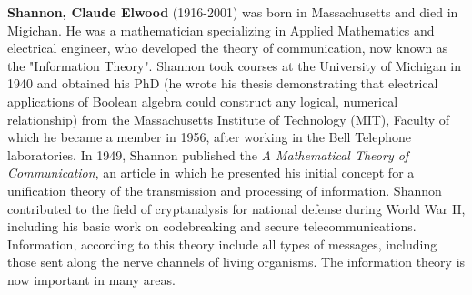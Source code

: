 \textbf{Shannon, Claude Elwood} (1916-2001) was born in Massachusetts and died in Migichan. He was a mathematician specializing in Applied Mathematics and electrical engineer, who developed the theory of communication, now known as the "Information Theory". Shannon took courses at the University of Michigan in 1940 and obtained his PhD (he wrote his thesis demonstrating that electrical applications of Boolean algebra could construct any logical, numerical relationship) from the Massachusetts Institute of Technology (MIT), Faculty of which he became a member in 1956, after working in the Bell Telephone laboratories. In 1949, Shannon published the \textit{A Mathematical Theory of Communication}, an article in which he presented his initial concept for a unification theory of the transmission and processing of information. Shannon contributed to the field of cryptanalysis for national defense during World War II, including his basic work on codebreaking and secure telecommunications. Information, according to this theory include all types of messages, including those sent along the nerve channels of living organisms. The information theory is now important in many areas.

